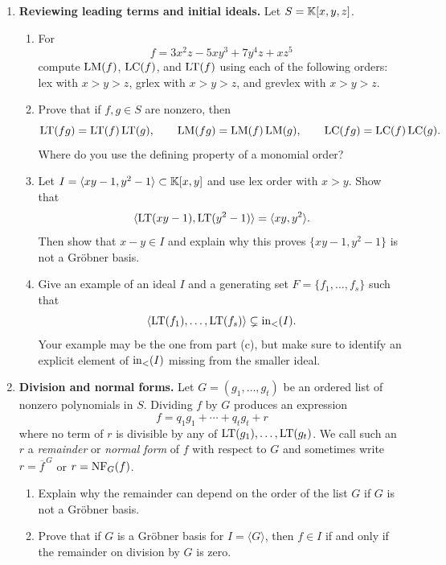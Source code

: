 \documentclass[12pt,reqno]{amsart}
\begin{document}
\hrulefill


\begin{enumerate}[leftmargin=*, series=problems]

\item \textbf{Reviewing leading terms and initial ideals.} Let $S=\mathbb{K}[x,y,z]$.
\begin{enumerate}[label=(\alph*),ref=\theenumi\alph*]
    \item For
    \[
    f=3x^2z-5xy^3+7y^4z+xz^5
    \]
    compute $\operatorname{LM}(f)$, $\operatorname{LC}(f)$, and $\operatorname{LT}(f)$ using each of the following orders: lex with $x>y>z$, grlex with $x>y>z$, and grevlex with $x>y>z$.
    
    \item Prove that if $f,g\in S$ are nonzero, then
    \[
    \operatorname{LT}(fg)=\operatorname{LT}(f)\operatorname{LT}(g), \qquad \operatorname{LM}(fg)=\operatorname{LM}(f)\operatorname{LM}(g), \qquad \operatorname{LC}(fg)=\operatorname{LC}(f)\operatorname{LC}(g).
    \]
    Where do you use the defining property of a monomial order?
    
    \item Let $I=\langle xy-1,y^2-1\rangle\subset \mathbb{K}[x,y]$ and use lex order with $x>y$. Show that
    \[
    \langle \operatorname{LT}(xy-1),\operatorname{LT}(y^2-1)\rangle=\langle xy,y^2\rangle.
    \]
    Then show that $x-y\in I$ and explain why this proves $\{xy-1,y^2-1\}$ is not a Gr\"obner basis.
    
    \item Give an example of an ideal $I$ and a generating set $F=\{f_1,\ldots,f_s\}$ such that
    \[
    \langle \operatorname{LT}(f_1),\ldots,\operatorname{LT}(f_s)\rangle \subsetneq \operatorname{in}_<(I).
    \]
    Your example may be the one from part (c), but make sure to identify an explicit element of $\operatorname{in}_<(I)$ missing from the smaller ideal.
\end{enumerate}

\item \textbf{Division and normal forms.} Let $G=(g_1,\ldots,g_t)$ be an ordered list of nonzero polynomials in $S$. Dividing $f$ by $G$ produces an expression
\[
    f=q_1g_1+\cdots+q_tg_t+r
\]
where no term of $r$ is divisible by any of $\operatorname{LT}(g_1),\ldots,\operatorname{LT}(g_t)$. We call such an $r$ a \emph{remainder} or \emph{normal form} of $f$ with respect to $G$ and sometimes write $r=\overline{f}^{\,G}$ or $r=\operatorname{NF}_G(f)$.
\begin{enumerate}[label=(\alph*),ref=\theenumi\alph*]
    \item Explain why the remainder can depend on the order of the list $G$ if $G$ is not a Gr\"obner basis.
    
    \item Prove that if $G$ is a Gr\"obner basis for $I=\langle G\rangle$, then $f\in I$ if and only if the remainder on division by $G$ is zero.
    

\end{enumerate}
\end{enumerate}
\end{document}
